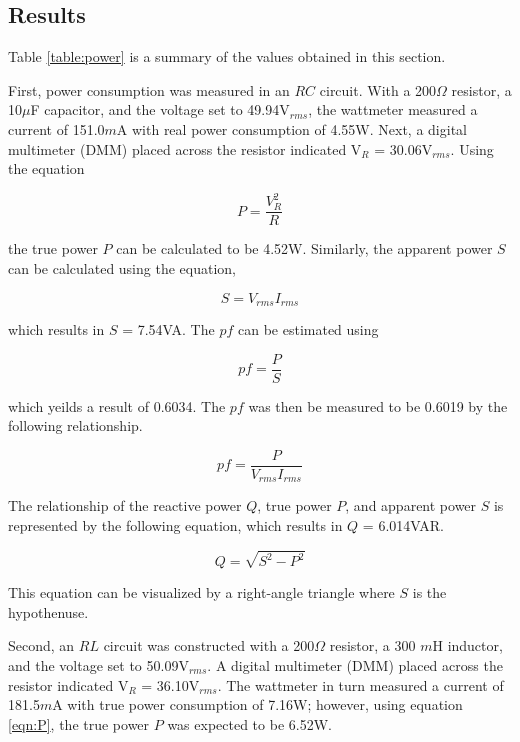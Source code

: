 \documentclass[12pt]{article}
\newcommand{\rms}{\ensuremath{_{rms}}}
\begin{document}
\subsection{Results}\label{sec:pow_results}

Table \ref{table:power} is a summary of the values obtained in this section.

First, power consumption was measured in an $RC$ circuit. With a 200$\Omega$ resistor, a 10$\mu$F capacitor, and the voltage set to 49.94V$_{rms}$, the wattmeter measured a current of 151.0$m$A with real power consumption of 4.55W. Next, a digital multimeter (DMM) placed across the resistor indicated V$_R$ = 30.06V$_{rms}$. Using the equation

\begin{equation}
	P = \frac{V_{R}^2}{R} 
	\label{eqn:P}
\end{equation}

the true power $P$ can be calculated to be 4.52W. Similarly, the apparent power $S$ can be calculated using the equation,

\begin{equation}
	S = {V_{rms}}{I_{rms}}
	\label{eqn:S} 
\end{equation}

which results in $S$ = 7.54VA. The $pf$ can be estimated using 

\begin{equation}
	pf = \frac{P}{S}
	\label{eqn:pf}
\end{equation}

which yeilds a result of 0.6034. The $pf$ was then be measured to be 0.6019 by the following relationship.

\begin{equation}
	pf = \frac{P}{V\rms I\rms}
	\label{eqn:pf_rms}
\end{equation}

The relationship of the reactive power $Q$, true power $P$, and apparent power $S$ is represented by the following equation, which results in $Q$ = 6.014VAR.

\begin{equation}
	Q = \sqrt{S^2 - P^2}
	\label{eqn:Q}
\end{equation}

This equation can be visualized by a right-angle triangle where $S$ is the hypothenuse.

Second, an $RL$ circuit was constructed with a 200$\Omega$ resistor, a 300 $m$H inductor, and the voltage set to 50.09V$_{rms}$. A digital multimeter (DMM) placed across the resistor indicated V$_R$ = 36.10V$_{rms}$. The wattmeter in turn measured a current of 181.5$m$A with true power consumption of 7.16W; however, using equation \ref{eqn:P}, the true power $P$ was expected to be 6.52W. 
\end{document}
